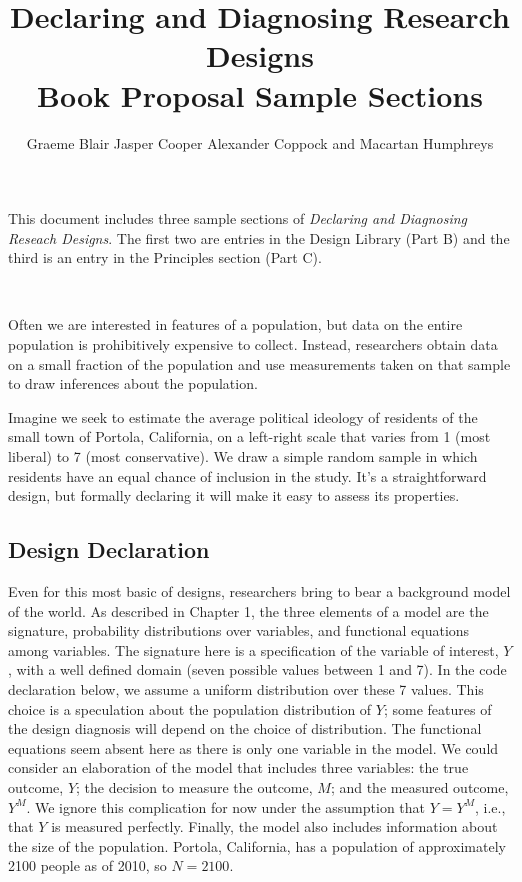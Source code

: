 \documentclass[11pt]{article}\usepackage[]{graphicx}\usepackage[]{color}
\title{Declaring and Diagnosing Research Designs \\ {\normalsize Book Proposal Sample Sections}}
\author{Graeme Blair \quad Jasper Cooper \quad Alexander Coppock \quad and Macartan Humphreys}
\newcommand\M{\marginnote{\LARGE \sc M}\noindent}
\begin{document}
\maketitle

\noindent This document includes three sample sections of \textit{Declaring and Diagnosing Reseach Designs}. The first two are entries in the Design Library (Part B) and the third is an entry in the Principles section (Part C).






\bigskip \bigskip

\tableofcontents

\clearpage
 \\


\noindent Often we are interested in features of a population, but data on the entire population is prohibitively expensive to collect. Instead, researchers obtain data on a small fraction of the population and use measurements taken on that sample to draw inferences about the population.

Imagine we seek to estimate the average political ideology of residents of the small town of Portola, California, on a left-right scale that varies from 1 (most liberal) to 7 (most conservative). We draw a simple random sample in which residents have an equal chance of inclusion in the study. It's a straightforward design, but formally declaring it will make it easy to assess its properties. \smallskip

\subsection*{Design Declaration}

\M Even for this most basic of designs, researchers bring to bear a background model of the world. As described in Chapter 1, the three elements of a model are the signature, probability distributions over variables, and functional equations among variables. The signature here is a specification of the variable of interest, $Y$, with a well defined domain (seven possible values between 1 and 7). In the code declaration below, we assume a uniform distribution over these 7 values. This choice is a speculation about the population distribution of $Y$; some features of the design diagnosis will depend on the choice of distribution. The functional equations seem absent here as there is only one variable in the model. We could consider an elaboration of the model that includes three variables: the true outcome, $Y$; the decision to measure the outcome, $M$; and the measured outcome, $Y^M$. We ignore this complication for now under the assumption that $Y = Y^M$, i.e., that $Y$ is measured perfectly. Finally, the model also includes information about the size of the population. Portola, California, has a population of approximately 2100 people as of 2010, so $N = 2100$.
\end{document}
